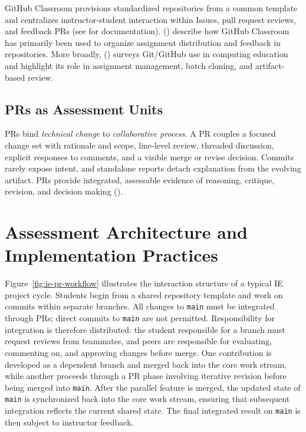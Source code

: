 GitHub Classroom provisions standardized repositories from a common template and centralizes instructor-student interaction within Issues, pull request reviews, and feedback PRs (see \cite{github_collaboration_workflow} for documentation). \citeauthor{bennedsen2022usinggithub} (\citeyear{bennedsen2022usinggithub}) describe how GitHub Classroom has primarily been used to organize assignment distribution and feedback in repositories. More broadly, \citeauthor{githubsurvey} (\citeyear{githubsurvey}) surveys Git/GitHub use in computing education and highlight its role in assignment management, batch cloning, and artifact-based review.


\subsection{PRs as Assessment Units}

PRs bind \emph{technical change} to \emph{collaborative process}. A PR couples a focused change set with rationale and scope, line-level review, threaded discussion, explicit responses to comments, and a visible merge or revise decision. Commits rarely expose intent, and standalone reports detach explanation from the evolving artifact. PRs provide integrated, assessable evidence of reasoning, critique, revision, and decision making (\cite{PetreWilson2014WSSSPE,githubsurvey}).


\section{Assessment Architecture and Implementation Practices}
Figure~\ref{fig:ie-pr-workflow} illustrates the interaction structure of a typical IE project cycle. Students begin from a shared repository template and work on commits within separate branches. All changes to \texttt{main} must be integrated through PRs; direct commits to \texttt{main} are not permitted. Responsibility for integration is therefore distributed: the student responsible for a branch must request reviews from teammates, and peers are responsible for evaluating, commenting on, and approving changes before merge. One contribution is developed as a dependent branch and merged back into the core work stream, while another proceeds through a PR phase involving iterative revision before being merged into \texttt{main}. After the parallel feature is merged, the updated state of \texttt{main} is synchronized back into the core work stream, ensuring that subsequent integration reflects the current shared state. The final integrated result on \texttt{main} is then subject to instructor feedback.

